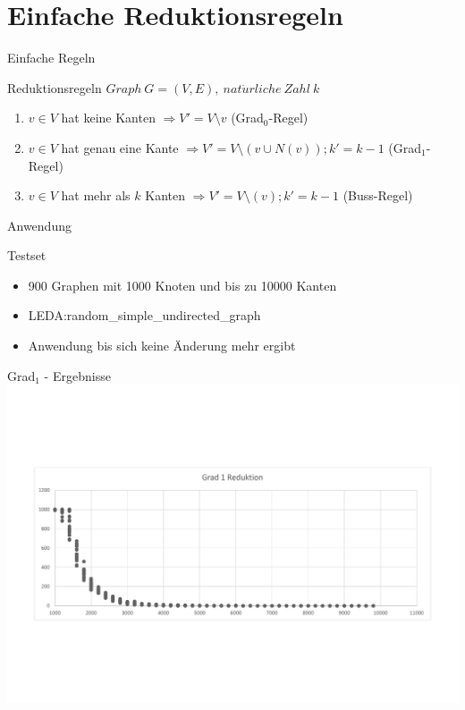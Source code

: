 \documentclass{beamer}
\begin{document}
\section{Einfache Reduktionsregeln}
\begin{frame}{Einfache Regeln}
\begin{block}{Reduktionsregeln}\pause
$Graph\ G=(V,E),\ nat\ddot{u}rliche\ Zahl\ k$\pause
\begin{enumerate}
\item $v \in V$ hat keine Kanten $\Rightarrow V' = V \setminus v$ (Grad$_{0}$-Regel) \pause
\item $v \in V$ hat genau eine Kante $\Rightarrow V' = V \setminus (v \cup N(v)); k' = k-1 $ (Grad$_{1}$-Regel) \pause
\item $v \in V$ hat mehr als $k$ Kanten $\Rightarrow V' = V \setminus (v); k' = k-1 $ (Buss-Regel)

\end{enumerate}
\end{block}
\end{frame}

\begin{frame}{Anwendung}
\begin{block}{Testset}\pause
\begin{itemize}
\item 900 Graphen mit 1000 Knoten und bis zu 10000 Kanten\pause
\item LEDA:random\_simple\_undirected\_graph\pause
\item Anwendung bis sich keine Änderung mehr ergibt
\end{itemize}
\end{block}
\end{frame}


\begin{frame}{Grad$_{1}$ - Ergebnisse}
\includegraphics[scale= .4]{analysisOne.pdf} 
\end{frame}
\end{document}
